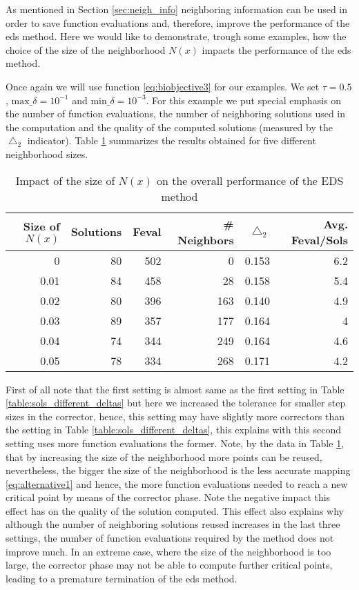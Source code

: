 As mentioned in Section \ref{sec:neigh_info} neighboring information can be used in order to save function evaluations and, therefore, improve the performance of the \gls{eds} method. Here we would like to demonstrate, trough some examples, how the choice of the size of the neighborhood $N(x)$ impacts the performance of the \gls{eds} method.

Once again we will use function \eqref{eq:biobjective3} for our examples. We set $\tau = 0.5$, $\text{max\_}\delta = 10^{-1}$ and $\text{min\_}\delta = 10^{-3}$. For this example we put special emphasis on the number of function evaluations, the number of neighboring solutions used in the computation and the quality of the computed solutions (measured by the $\bigtriangleup_2$ indicator). Table \ref{table:impact_of_nx} summarizes the results obtained for five different neighborhood sizes.

\begin{table}[!htb]
\centering
\begin{tabular}{| r  r  r  r  r  r |}
	\hline
	Size of $N(x)$ & Solutions & Feval & \# Neighbors & $\bigtriangleup_2$ & Avg. Feval/Sols\\  
  	\hline
	0 & 80 & 502 & 0 & 0.153 & 6.2\\
	0.01 & 84 & 458 & 28 & 0.158 & 5.4\\
	0.02 & 80 & 396 & 163 & 0.140 & 4.9\\
	0.03 & 89 & 357 & 177 & 0.164 & 4\\
	0.04 & 74 & 344 & 249 & 0.164 & 4.6\\
	0.05 & 78 & 334 & 268 & 0.171 & 4.2\\
  	\hline
\end{tabular}
\caption{Impact of the size of $N(x)$ on the overall performance of the EDS method}
\label{table:impact_of_nx}
\end{table}

First of all note that the first setting is almost same as the first setting in Table \ref{table:sols_different_deltas} but here we increased the tolerance for smaller step sizes in the corrector, hence, this setting may have slightly more correctors than the setting in Table \ref{table:sols_different_deltas}, this explains with this second setting uses more function evaluations the former. Note, by the data in Table \ref{table:impact_of_nx}, that by increasing the size of the neighborhood more points can be reused, nevertheless, the bigger the size of the neighborhood is the less accurate mapping \eqref{eq:alternative1} and hence, the more function evaluations needed to reach a new critical point by means of the corrector phase. Note the negative impact this effect has on the quality of the solution computed. This effect also explains why although the number of neighboring solutions reused increases in the last three settings, the number of function evaluations required by the method does not improve much. In an extreme case, where the size of the neighborhood is too large, the corrector phase may not be able to compute further critical points, leading to a premature termination of the \gls{eds} method.